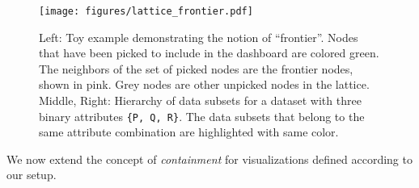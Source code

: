 \begin{figure}[ht!]
\texttt{[image: figures/lattice\_frontier.pdf]}
\caption{Left: Toy example demonstrating the notion of ``frontier''. Nodes that have been picked to include in the dashboard are colored green. The neighbors of the set of picked nodes are the frontier nodes, shown in pink. Grey nodes are other unpicked nodes in the lattice. Middle, Right: Hierarchy of data subsets for a dataset with three binary attributes {\tt \{P, Q, R\}}. The data subsets that belong to the same attribute combination are highlighted with same color.}
\label{fig:lattice}
\end{figure}
We now extend the concept of \emph{containment} for visualizations defined according to our setup. 





